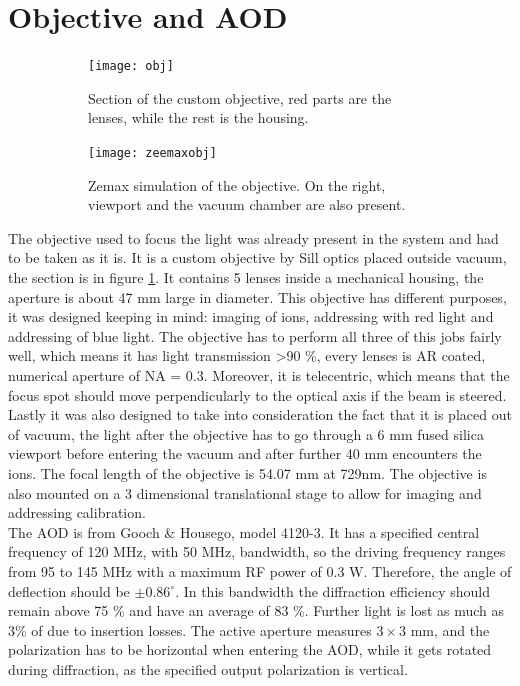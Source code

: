 \section{Objective and AOD}
\label{sec:obj}
\begin{figure}[H]
     \centering
     \begin{subfigure}[b]{0.4\textwidth}
         \centering
         \texttt{[image: obj]}
          \caption{Section of the custom objective, red parts are the lenses, while the rest is the housing.}
         \label{objsection}
     \end{subfigure}
     \hfill
     \begin{subfigure}[b]{0.55\textwidth}
         \centering
         \texttt{[image: zeemaxobj]}
         \vspace{1em}
         \caption{Zemax simulation of the objective. On the right, viewport and the vacuum chamber are also present.}

     \end{subfigure}
        \caption{}
\end{figure}
The objective used to focus the light was already present in the system and had to be taken as it is. It is a custom objective by Sill optics placed outside vacuum, the section is in figure \ref{objsection}. It contains 5 lenses inside a mechanical housing, the aperture is about 47 mm large in diameter.
This objective has different purposes, it was designed keeping in mind: imaging of ions, addressing with red light and addressing of blue light. The objective has to perform all three of this jobs fairly well, which means it has light transmission >90 \%, every lenses is AR coated, numerical aperture of NA = 0.3. Moreover, it is telecentric, which means that the focus spot should move perpendicularly to the optical axis if the beam is steered.
 Lastly it was also designed to take into consideration the fact that it is placed out of vacuum, the light after the objective has to go through a 6 mm fused silica viewport before entering the vacuum and after further 40 mm encounters the ions. The focal length of the objective is 54.07 mm at 729nm. The objective is also mounted on a 3 dimensional translational stage to allow for imaging and addressing calibration.\\
The AOD is from Gooch \& Housego, model 4120-3. It has a specified central frequency of 120 MHz, with 50 MHz, bandwidth, so the driving frequency ranges from 95 to 145 MHz with a maximum RF power of 0.3 W. Therefore, the angle of deflection should be $\pm 0.86^{\circ}$.  In this bandwidth the diffraction efficiency should remain above 75 \% and have an average of 83 \%. Further light is lost as much as 3\% of due to insertion losses. The active aperture measures $3\times 3$ mm, and the polarization has to be horizontal when entering the AOD, while it gets rotated during diffraction, as the specified output polarization is vertical.

